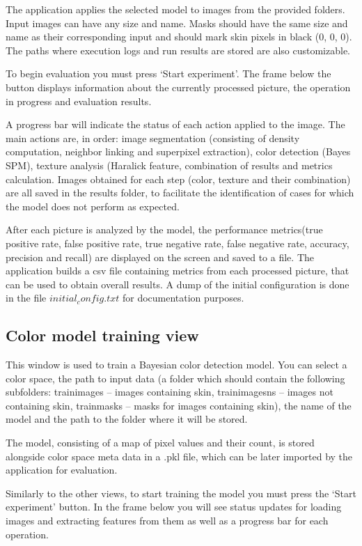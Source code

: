 \documentclass[12pt]{report}
\begin{document}
	The application applies the selected model to images from the provided folders. Input images can have any size and name. Masks should have the same size and name as their corresponding input and should mark skin pixels in black (0, 0, 0). The paths where execution logs and run results are stored are also customizable.
	
	To begin evaluation you must press ‘Start experiment’. The frame below the button displays information about the currently processed picture, the operation in progress and evaluation results. 
	
	A progress bar will indicate the status of each action applied to the image. The main actions are, in order: image segmentation (consisting of density computation, neighbor linking and superpixel extraction), color detection (Bayes SPM), texture analysis (Haralick feature, combination of results and metrics calculation. Images obtained for each step (color, texture and their combination) are all saved in the results folder, to facilitate the identification of cases for which the model does not perform as expected.
	
	After each picture is analyzed by the model, the performance metrics(true positive rate, false positive rate, true negative rate, false negative rate, accuracy, precision and recall) are displayed on the screen and saved to a file.
	The application builds a csv file containing metrics from each processed picture, that can be used to obtain overall results. A dump of the initial configuration is done in the file $initial_config.txt$ for documentation purposes.
	
	\subsection{Color model training view}
	This window is used to train a Bayesian color detection model. You can select a color space, the path to input data (a folder which should contain the following subfolders: train\textunderscore images – images containing skin, train\textunderscore images\textunderscore ns – images not containing skin, train\textunderscore masks – masks for images containing skin), the name of the model and the path to the folder where it will be stored. 
	
	The model, consisting of a map of pixel values and their count, is stored alongside color space meta data in a .pkl file, which can be later imported by the application for evaluation.
	
	Similarly to the other views, to start training the model you must press the ‘Start experiment’ button. In the frame below you will see status updates for loading images and extracting features from them as well as a progress bar for each operation.
	
\end{document}
